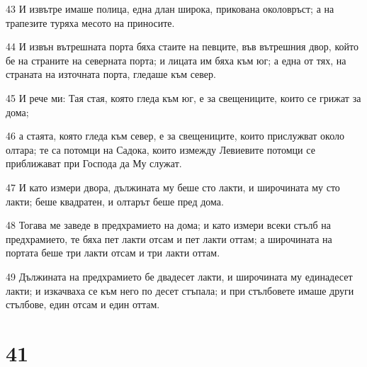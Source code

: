 \par 43 И извътре имаше полица, една длан широка, прикована околовръст; а на трапезите туряха месото на приносите.
\par 44 И извън вътрешната порта бяха стаите на певците, във вътрешния двор, който бе на страните на северната порта; и лицата им бяха към юг; а една от тях, на страната на източната порта, гледаше към север.
\par 45 И рече ми: Тая стая, която гледа към юг, е за свещениците, които се грижат за дома;
\par 46 а стаята, която гледа към север, е за свещениците, които прислужват около олтара; те са потомци на Садока, които измежду Левиевите потомци се приближават при Господа да Му служат.
\par 47 И като измери двора, дължината му беше сто лакти, и широчината му сто лакти; беше квадратен, и олтарът беше пред дома.
\par 48 Тогава ме заведе в предхрамието на дома; и като измери всеки стълб на предхрамието, те бяха пет лакти отсам и пет лакти оттам; а широчината на портата беше три лакти отсам и три лакти оттам.
\par 49 Дължината на предхрамието бе двадесет лакти, и широчината му единадесет лакти; и изкачваха се към него по десет стъпала; и при стълбовете имаше други стълбове, един отсам и един оттам.

\chapter{41}

